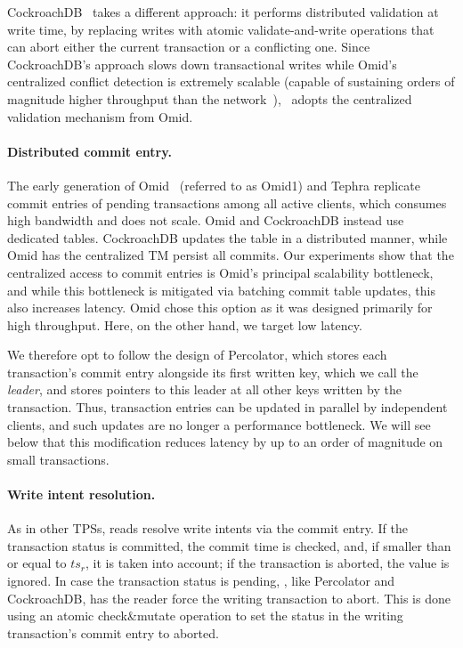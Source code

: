 CockroachDB~\cite{cockroach} takes a different approach: it performs distributed validation at write time, by replacing writes with atomic validate-and-write operations that can abort either the current transaction or a conflicting one. 
Since CockroachDB's approach slows down transactional writes while Omid's centralized conflict detection is extremely scalable
(capable of sustaining orders of magnitude higher throughput than the network~\cite{Omid2017}),  
\sys\ adopts the centralized validation mechanism from Omid. 


\paragraph{Distributed commit entry.}
The early generation of Omid~\cite{OmidICDE2014} (referred to as Omid1) and Tephra replicate commit entries 
of pending transactions among all active clients, 
which consumes high bandwidth and does not scale. Omid and CockroachDB instead use dedicated tables. CockroachDB updates the table in a distributed manner, 
while Omid has the centralized TM persist all commits. 
Our experiments show that the centralized access to commit entries is Omid's principal scalability bottleneck, and while this bottleneck is mitigated via batching commit table updates, this also increases latency.
Omid chose this  option as it was designed primarily for high throughput. Here, on the other hand, we target  low latency. 

We therefore opt to follow the design of Percolator, which stores each transaction's commit entry alongside its first written key,
which we call the \emph{leader}, and stores pointers to this leader at all other keys written by the transaction. 
Thus,  transaction entries can be updated in parallel by 
independent clients, and such updates are no longer a performance bottleneck. 
We will see below that this modification reduces latency
by up to an order of magnitude on small transactions.

\paragraph{Write intent resolution.}

As in other TPSs, reads resolve write intents via the commit entry.
If the transaction status is committed, the commit time is checked, and, if smaller than or equal to $ts_r$, it is taken into account;
if the transaction is aborted, the value is ignored.
In case the transaction status is pending, \sys, like Percolator and CockroachDB, has the reader
force the writing transaction to abort. This is done using an atomic check\&mutate operation to set the status in the
writing transaction's commit entry to aborted.

